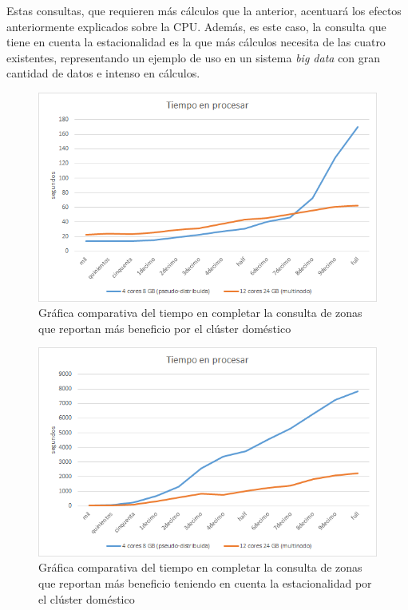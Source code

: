 Estas consultas, que requieren más cálculos que la anterior, acentuará los efectos anteriormente explicados sobre la \gls{CPU}. Además, es este caso, la consulta que tiene en cuenta la estacionalidad es la que más cálculos necesita de las cuatro existentes, representando un ejemplo de uso en un sistema \textit{big data} con gran cantidad de datos e intenso en cálculos.

\begin{figure}[htp!]
	\centering
	\caption{Gráfica comparativa del tiempo en completar la consulta de zonas que reportan más beneficio por el clúster doméstico}
	\label{gra:tiemProDom}
	\vspace{5pt}
	\includegraphics[scale=0.9]{graficas/tbdom}
\end{figure}
\begin{figure}[htp!]
	\centering
	\caption{Gráfica comparativa del tiempo en completar la consulta de zonas que reportan más beneficio teniendo en cuenta la estacionalidad por el clúster doméstico}
	\label{gra:tiemProDayDom}
	\vspace{5pt}
	\includegraphics[scale=0.9]{graficas/tbddom}
\end{figure}
